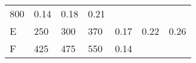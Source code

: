 \documentclass[11pt]{article}
\begin{document}
\begin{longtable}[]{@{}lllllll@{}}
\begin{minipage}[t]{0.04\columnwidth}
800\strut
\end{minipage} & \begin{minipage}[t]{0.04\columnwidth}\raggedright\strut
0.14\strut
\end{minipage} & \begin{minipage}[t]{0.04\columnwidth}\raggedright\strut
0.18\strut
\end{minipage} & \begin{minipage}[t]{0.04\columnwidth}\raggedright\strut
0.21\strut
\end{minipage}\tabularnewline
\begin{minipage}[t]{0.04\columnwidth}\raggedright\strut
E\strut
\end{minipage} & \begin{minipage}[t]{0.04\columnwidth}\raggedright\strut
250\strut
\end{minipage} & \begin{minipage}[t]{0.04\columnwidth}\raggedright\strut
300\strut
\end{minipage} & \begin{minipage}[t]{0.04\columnwidth}\raggedright\strut
370\strut
\end{minipage} & \begin{minipage}[t]{0.04\columnwidth}\raggedright\strut
0.17\strut
\end{minipage} & \begin{minipage}[t]{0.04\columnwidth}\raggedright\strut
0.22\strut
\end{minipage} & \begin{minipage}[t]{0.04\columnwidth}\raggedright\strut
0.26\strut
\end{minipage}\tabularnewline
\begin{minipage}[t]{0.04\columnwidth}\raggedright\strut
F\strut
\end{minipage} & \begin{minipage}[t]{0.04\columnwidth}\raggedright\strut
425\strut
\end{minipage} & \begin{minipage}[t]{0.04\columnwidth}\raggedright\strut
475\strut
\end{minipage} & \begin{minipage}[t]{0.04\columnwidth}\raggedright\strut
550\strut
\end{minipage} & \begin{minipage}[t]{0.04\columnwidth}\raggedright\strut
0.14\strut
\end{minipage} & \begin{minipage}[t]{0.04\columnwidth}\raggedright\strut

\end{minipage}
\end{longtable}
\end{document}
